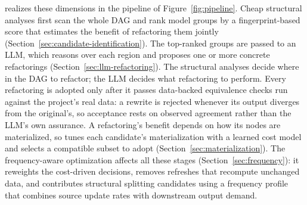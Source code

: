 
\tool{} realizes these dimensions in the pipeline of Figure~\ref{fig:pipeline}. Cheap structural analyses first scan the whole DAG and rank model groups by a fingerprint-based score that estimates the benefit of refactoring them jointly (Section~\ref{sec:candidate-identification}). The top-ranked groups are passed to an LLM, which reasons over each region and proposes one or more concrete refactorings (Section~\ref{sec:llm-refactoring}). 
The structural analyses decide where in the DAG to refactor; the LLM decides what refactoring to perform.
Every refactoring is adopted only after it passes data-backed equivalence checks run against the project's real data: a rewrite is rejected whenever its output diverges from the original's, so acceptance rests on observed agreement rather than the LLM's own assurance.
A refactoring's benefit depends on how its nodes are materialized, so \tool{} tunes each candidate's materialization with a learned cost model and selects a compatible subset to adopt (Section~\ref{sec:materialization}). The frequency-aware optimization affects all these stages (Section~\ref{sec:frequency}): it reweights the cost-driven decisions, removes refreshes that recompute unchanged data, and contributes structural splitting candidates using a frequency profile that combines source update rates with downstream output demand.






